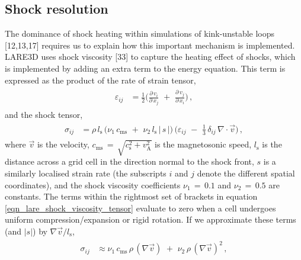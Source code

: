 \documentclass{./packages/rs/rsproca}
\begin{document}
\subsection{Shock resolution}
\label{sec_NumericalCode_ShockResolution}
The dominance of shock heating within simulations of kink-unstable loops [12,13,17] requires us to explain how this important mechanism is implemented. LARE3D uses shock viscosity [33] to capture the heating effect of shocks, which is implemented by adding an extra term to the energy equation. This term is expressed as the product of the rate of strain tensor,
\begin{align}\begin{split}
\label{eqn_lare_strain_tensor}
\varepsilon_{ij} &= \frac{1}{2}\Bigg(\frac{\partial\,v_i}{\partial\,x_j}\,\,+\,\,\frac{\partial\,v_j}{\partial\,x_i}\Bigg)\,,
\end{split}\end{align}
and the shock tensor,
\begin{align}\begin{split}
\label{eqn_lare_shock_viscosity_tensor}
\sigma_{ij} &= \rho\,l_{\mathrm{s}}\,\Big(\nu_1\,c_{\mathrm{ms}}\,\,+\,\,\nu_2\,l_{\mathrm{s}}\,|\,s\,|\Big)\,\Bigg(\varepsilon_{ij}\,\,-\,\,\frac{1}{3}\,\delta_{ij}\,\nabla\cdot\vec{v}\Bigg)\,,
\end{split}\end{align}
where $\vec{v}$ is the velocity, $c_{\mathrm{ms}}\,{=}\,\sqrt{c_{\mathrm{s}}^2 + v_{\mathrm{A}}^2}$ is the magnetosonic speed, $l_{\mathrm{s}}$ is the distance across a grid cell in the direction normal to the shock front, $s$ is a similarly localised strain rate (the subscripts $i$ and $j$ denote the different spatial coordinates), and the shock viscosity coefficients $\nu_1\,{=}\,0.1$ and $\nu_2\,{=}\,0.5$ are constants. The terms within the rightmost set of brackets in equation \ref{eqn_lare_shock_viscosity_tensor} evaluate to zero when a cell undergoes uniform compression/expansion or rigid rotation. If we approximate these terms (and $|s|$) by $\nabla \vec{v}/l_{\mathrm{s}}$,
\begin{align}\begin{split}
\label{eqn_lare_shock_viscosity_tensor_simple}
\sigma_{ij} &\approx \nu_1\,c_{\mathrm{ms}}\,\rho\,(\nabla\vec{v})\,\,+\,\,\nu_2\,\rho\,(\nabla\vec{v})^2\,,
\end{split}\end{align}
\end{document}
